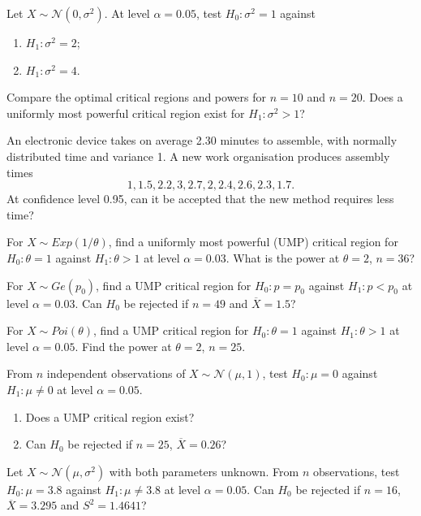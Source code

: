 \documentclass[a4paper]{report}
\begin{document}
\begin{problem}
Let $X\sim\mathcal N(0,\sigma^2)$. At level $\alpha=0.05$, test $H_0:\sigma^2=1$ against
\begin{enumerate}\item $H_1:\sigma^2=2$;\item $H_1:\sigma^2=4$.\end{enumerate}
Compare the optimal critical regions and powers for $n=10$ and $n=20$. Does a uniformly most powerful critical region exist for $H_1:\sigma^2>1$?
\end{problem}
\begin{problem}
An electronic device takes on average 2.30 minutes to assemble, with normally distributed time and variance 1. A new work organisation produces assembly times
\[1,1.5,2.2,3,2.7,2,2.4,2.6,2.3,1.7.\]
At confidence level 0.95, can it be accepted that the new method requires less time?
\end{problem}
\begin{problem}
For $X\sim Exp(1/\theta)$, find a uniformly most powerful (UMP) critical region for $H_0:\theta=1$ against $H_1:\theta>1$ at level $\alpha=0.03$. What is the power at $\theta=2$, $n=36$?
\end{problem}
\begin{problem}
For $X\sim Ge(p_0)$, find a UMP critical region for $H_0:p=p_0$ against $H_1:p<p_0$ at level $\alpha=0.03$. Can $H_0$ be rejected if $n=49$ and $\overline X=1.5$?
\end{problem}
\begin{problem}
For $X\sim Poi(\theta)$, find a UMP critical region for $H_0:\theta=1$ against $H_1:\theta>1$ at level $\alpha=0.05$. Find the power at $\theta=2$, $n=25$.
\end{problem}
\begin{problem}
From $n$ independent observations of $X\sim\mathcal N(\mu,1)$, test $H_0:\mu=0$ against $H_1:\mu\ne0$ at level $\alpha=0.05$.
\begin{enumerate}\item Does a UMP critical region exist?\item Can $H_0$ be rejected if $n=25$, $\overline X=0.26$?\end{enumerate}
\end{problem}
\begin{problem}
Let $X\sim\mathcal N(\mu,\sigma^2)$ with both parameters unknown. From $n$ observations, test $H_0:\mu=3.8$ against $H_1:\mu\ne3.8$ at level $\alpha=0.05$. Can $H_0$ be rejected if $n=16$, $\overline X=3.295$ and $S^2=1.4641$?
\end{problem}
\end{document}

